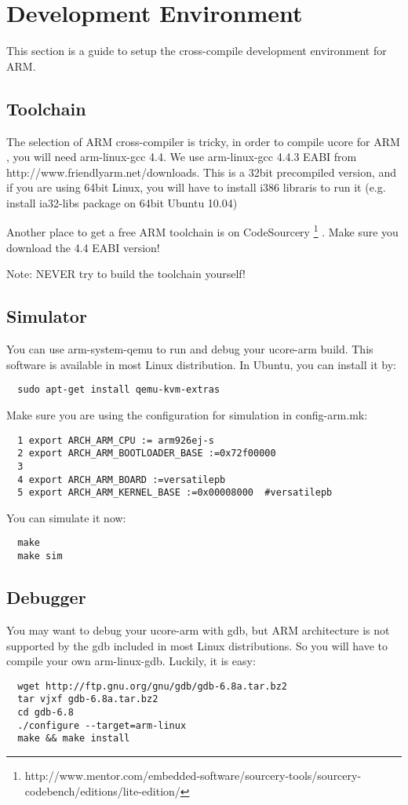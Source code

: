 \documentclass[a4paper]{article}
\begin{document}
\section{Development Environment}
This section is a guide to setup the cross-compile development environment for
ARM.

\subsection{Toolchain}
The selection of ARM cross-compiler is tricky, in order to compile ucore for ARM
, you will need arm-linux-gcc 4.4. We use arm-linux-gcc 4.4.3 EABI from 
http://www.friendlyarm.net/downloads. This is a 32bit precompiled version,
and if you are using 64bit Linux, you will have to install i386 libraris to run
it (e.g. install ia32-libs package on 64bit Ubuntu 10.04)

Another place to get a free ARM toolchain is on CodeSourcery
\footnote{http://www.mentor.com/embedded-software/sourcery-tools/sourcery-codebench/editions/lite-edition/}
.
Make sure you download the 4.4 EABI version!

Note: NEVER try to build the toolchain yourself!

\subsection{Simulator}
You can use arm-system-qemu to run and debug your ucore-arm build. This software is
available in most Linux distribution. In Ubuntu, you can install it by:
\begin{verbatim}
  sudo apt-get install qemu-kvm-extras
\end{verbatim}

Make sure you are using the configuration for simulation in config-arm.mk:
\begin{verbatim}
  1 export ARCH_ARM_CPU := arm926ej-s
  2 export ARCH_ARM_BOOTLOADER_BASE :=0x72f00000
  3 
  4 export ARCH_ARM_BOARD :=versatilepb
  5 export ARCH_ARM_KERNEL_BASE :=0x00008000  #versatilepb
\end{verbatim}

You can simulate it now:
\begin{verbatim}
  make 
  make sim
\end{verbatim}

\subsection{Debugger}
You may want to debug your ucore-arm with gdb, but 
ARM architecture is not supported by the gdb
included in most Linux distributions. So you will
have to compile your own arm-linux-gdb. Luckily,
it is easy:
\begin{verbatim}
  wget http://ftp.gnu.org/gnu/gdb/gdb-6.8a.tar.bz2
  tar vjxf gdb-6.8a.tar.bz2
  cd gdb-6.8
  ./configure --target=arm-linux
  make && make install
\end{verbatim}
\end{document}
